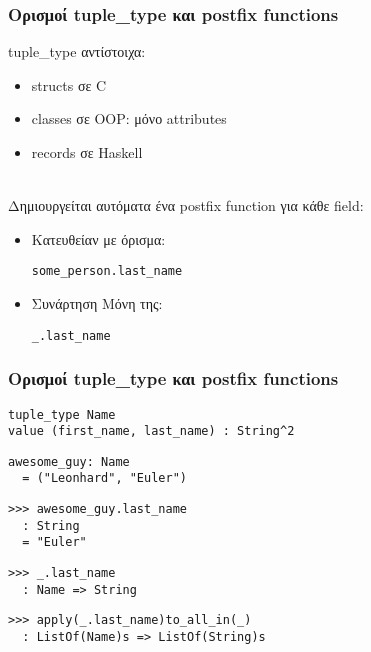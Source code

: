 \documentclass{beamer}
\def\e{\foreignlanguage{english}}
\def\h{\e{Haskell}}
\begin{document}
\begin{frame}[fragile]

\frametitle{Ορισμοί \e{tuple\_type} και \e{postfix functions}}

\e{tuple\_type} αντίστοιχα:

\begin{itemize}

\item \e{structs} σε \e{C}

\item \e{classes} σε \e{OOP}: μόνο \e{attributes}

\item \e{records} σε \h
\\~\

\end{itemize}

Δημιουργείται αυτόματα ένα \e{postfix function} για κάθε \e{field}:

\begin{itemize}

\item Κατευθείαν με όρισμα:
\begin{otherlanguage}{english}
\verb|some_person.last_name|
\end{otherlanguage}

\item Συνάρτηση Μόνη της:
\begin{otherlanguage}{english}
\verb|_.last_name|
\end{otherlanguage}

\end{itemize}

\end{frame}

\begin{frame}[fragile]

\frametitle{Ορισμοί \e{tuple\_type} και \e{postfix functions}}

\begin{otherlanguage}{english}
\begin{verbatim}
tuple_type Name
value (first_name, last_name) : String^2
\end{verbatim}
\begin{verbatim}
awesome_guy: Name
  = ("Leonhard", "Euler")
\end{verbatim}
\begin{verbatim}
>>> awesome_guy.last_name
  : String
  = "Euler"
\end{verbatim}
\begin{verbatim}
>>> _.last_name
  : Name => String
\end{verbatim}
\begin{verbatim}
>>> apply(_.last_name)to_all_in(_)
  : ListOf(Name)s => ListOf(String)s
\end{verbatim}
\end{otherlanguage}

\end{frame}
\end{document}
